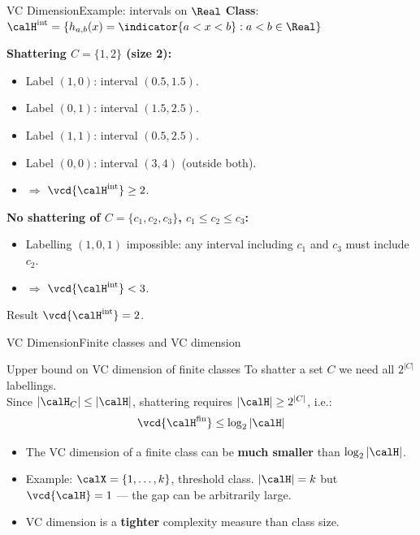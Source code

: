 \begin{frame}{VC Dimension}{Example: intervals on $\Real$}
  \textbf{Class}: $\calH^{\text{int}} = \{h_{a,b}(x) = \indicator{a<x<b} : a<b\in\Real\}$

  \medskip
  \textbf{Shattering $C=\{1,2\}$ (size 2):}
  \begin{itemize}
    \item Label $(1,0)$: interval $(0.5, 1.5)$. \checkmark
    \item Label $(0,1)$: interval $(1.5, 2.5)$. \checkmark
    \item Label $(1,1)$: interval $(0.5, 2.5)$. \checkmark
    \item Label $(0,0)$: interval $(3, 4)$ (outside both). \checkmark
    \item $\Rightarrow$ $\vcd{\calH^{\text{int}}} \geq 2$.
  \end{itemize}

  \medskip
  \textbf{No shattering of $C=\{c_1,c_2,c_3\}$, $c_1\leq c_2\leq c_3$:}
  \begin{itemize}
    \item Labelling $(1,0,1)$ impossible: any interval including $c_1$ and $c_3$ must
          include $c_2$.
    \item $\Rightarrow$ $\vcd{\calH^{\text{int}}} < 3$.
  \end{itemize}

  \begin{block}{Result}
    $\vcd{\calH^{\text{int}}} = 2$.
  \end{block}
\end{frame}

\begin{frame}{VC Dimension}{Finite classes and VC dimension}
  \begin{block}{Upper bound on VC dimension of finite classes}
    To shatter a set $C$ we need all $2^{|C|}$ labellings.\\
    Since $|\calH_C| \leq |\calH|$, shattering requires $|\calH| \geq 2^{|C|}$, i.e.:
    \[
      \vcd{\calH^{\text{fin}}} \leq \log_2|\calH|
    \]
  \end{block}
  \bigskip
  \begin{itemize}
    \item The VC dimension of a finite class can be \textbf{much smaller} than
          $\log_2|\calH|$.
    \item Example: $\calX=\{1,\ldots,k\}$, threshold class.
          $|\calH|=k$ but $\vcd{\calH}=1$ — the gap can be arbitrarily large.
    \item VC dimension is a \textbf{tighter} complexity measure than class size.
  \end{itemize}
\end{frame}

